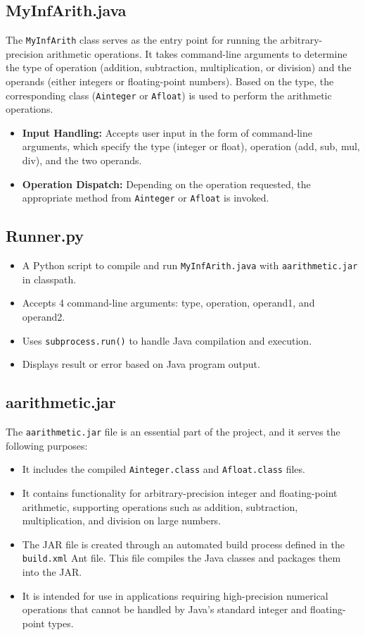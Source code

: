 \documentclass[12pt]{article}
\begin{document}
\subsection{MyInfArith.java}
The \texttt{MyInfArith} class serves as the entry point for running the arbitrary-precision arithmetic operations. It takes command-line arguments to determine the type of operation (addition, subtraction, multiplication, or division) and the operands (either integers or floating-point numbers). Based on the type, the corresponding class (\texttt{Ainteger} or \texttt{Afloat}) is used to perform the arithmetic operations.

\begin{itemize}
    \item \textbf{Input Handling:} Accepts user input in the form of command-line arguments, which specify the type (integer or float), operation (add, sub, mul, div), and the two operands.
    \item \textbf{Operation Dispatch:} Depending on the operation requested, the appropriate method from \texttt{Ainteger} or \texttt{Afloat} is invoked.
\end{itemize}
\subsection{Runner.py}
\begin{itemize}
    \item A Python script to compile and run \texttt{MyInfArith.java} with \texttt{aarithmetic.jar} in classpath.
    \item Accepts 4 command-line arguments: type, operation, operand1, and operand2.
    \item Uses \texttt{subprocess.run()} to handle Java compilation and execution.
    \item Displays result or error based on Java program output.
\end{itemize}

\subsection{aarithmetic.jar}

The \texttt{aarithmetic.jar} file is an essential part of the project, and it serves the following purposes:

\begin{itemize}
    \item It includes the compiled \texttt{Ainteger.class} and \texttt{Afloat.class} files.
    \item It contains functionality for arbitrary-precision integer and floating-point arithmetic, supporting operations such as addition, subtraction, multiplication, and division on large numbers.
    \item The JAR file is created through an automated build process defined in the \texttt{build.xml} Ant file. This file compiles the Java classes and packages them into the JAR.
    \item It is intended for use in applications requiring high-precision numerical operations that cannot be handled by Java's standard integer and floating-point types.
\end{itemize}
\end{document}
